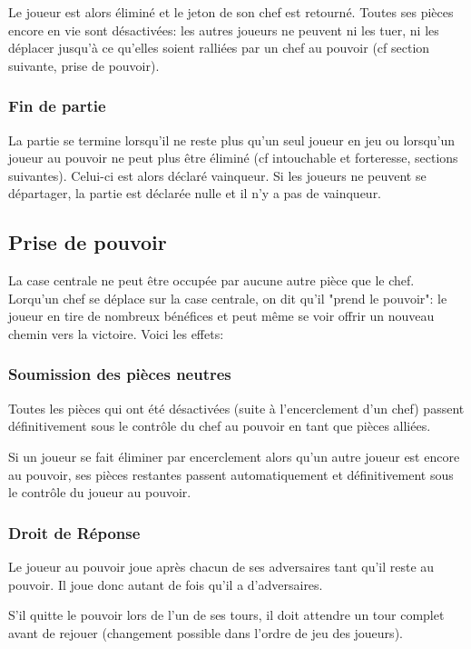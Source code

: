 \documentclass{article}
\begin{document}
Le joueur est alors éliminé et le jeton de son chef est retourné. Toutes ses pièces encore en vie sont désactivées: les autres joueurs ne peuvent ni les tuer, ni les déplacer jusqu'à ce qu'elles soient ralliées par un chef au pouvoir (cf section suivante, prise de pouvoir).

\subsubsection{Fin de partie}
La partie se termine lorsqu'il ne reste plus qu'un seul joueur en jeu ou lorsqu'un joueur au pouvoir ne peut plus être éliminé (cf intouchable et forteresse, sections suivantes).
Celui-ci est alors déclaré vainqueur.
Si les joueurs ne peuvent se départager, la partie est déclarée nulle et il n'y a pas de vainqueur.


\newpage

\subsection{Prise de pouvoir}
La case centrale ne peut être occupée par aucune autre pièce que le chef.
Lorqu'un chef se déplace sur la case centrale, on dit qu'il "prend le pouvoir": le joueur en tire de nombreux bénéfices et peut même se voir offrir un nouveau chemin vers la victoire.
Voici les effets:


\subsubsection{Soumission des pièces neutres}
Toutes les pièces qui ont été désactivées (suite à l'encerclement d'un chef) passent définitivement sous le contrôle du chef au pouvoir en tant que pièces alliées.

Si un joueur se fait éliminer par encerclement alors qu'un autre joueur est encore au pouvoir, ses pièces restantes passent automatiquement et définitivement sous le contrôle du joueur au pouvoir.

\subsubsection{Droit de Réponse}
Le joueur au pouvoir joue après chacun de ses adversaires tant qu'il reste au pouvoir. Il joue donc autant de fois qu'il a d'adversaires.

S'il quitte le pouvoir lors de l'un de ses tours, il doit attendre un tour complet avant de rejouer (changement possible dans l'ordre de jeu des joueurs).
\end{document}
